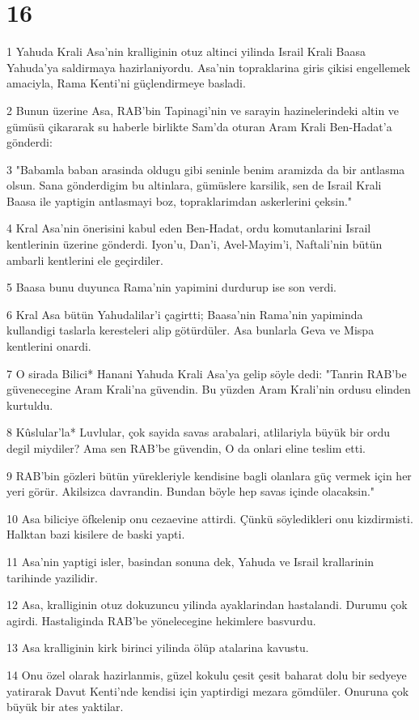 \chapter{16}

\par 1 Yahuda Krali Asa'nin kralliginin otuz altinci yilinda Israil Krali Baasa Yahuda'ya saldirmaya hazirlaniyordu. Asa'nin topraklarina giris çikisi engellemek amaciyla, Rama Kenti'ni güçlendirmeye basladi.
\par 2 Bunun üzerine Asa, RAB'bin Tapinagi'nin ve sarayin hazinelerindeki altin ve gümüsü çikararak su haberle birlikte Sam'da oturan Aram Krali Ben-Hadat'a gönderdi:
\par 3 "Babamla baban arasinda oldugu gibi seninle benim aramizda da bir antlasma olsun. Sana gönderdigim bu altinlara, gümüslere karsilik, sen de Israil Krali Baasa ile yaptigin antlasmayi boz, topraklarimdan askerlerini çeksin."
\par 4 Kral Asa'nin önerisini kabul eden Ben-Hadat, ordu komutanlarini Israil kentlerinin üzerine gönderdi. Iyon'u, Dan'i, Avel-Mayim'i, Naftali'nin bütün ambarli kentlerini ele geçirdiler.
\par 5 Baasa bunu duyunca Rama'nin yapimini durdurup ise son verdi.
\par 6 Kral Asa bütün Yahudalilar'i çagirtti; Baasa'nin Rama'nin yapiminda kullandigi taslarla keresteleri alip götürdüler. Asa bunlarla Geva ve Mispa kentlerini onardi.
\par 7 O sirada Bilici* Hanani Yahuda Krali Asa'ya gelip söyle dedi: "Tanrin RAB'be güvenecegine Aram Krali'na güvendin. Bu yüzden Aram Krali'nin ordusu elinden kurtuldu.
\par 8 Kûslular'la* Luvlular, çok sayida savas arabalari, atlilariyla büyük bir ordu degil miydiler? Ama sen RAB'be güvendin, O da onlari eline teslim etti.
\par 9 RAB'bin gözleri bütün yürekleriyle kendisine bagli olanlara güç vermek için her yeri görür. Akilsizca davrandin. Bundan böyle hep savas içinde olacaksin."
\par 10 Asa biliciye öfkelenip onu cezaevine attirdi. Çünkü söyledikleri onu kizdirmisti. Halktan bazi kisilere de baski yapti.
\par 11 Asa'nin yaptigi isler, basindan sonuna dek, Yahuda ve Israil krallarinin tarihinde yazilidir.
\par 12 Asa, kralliginin otuz dokuzuncu yilinda ayaklarindan hastalandi. Durumu çok agirdi. Hastaliginda RAB'be yönelecegine hekimlere basvurdu.
\par 13 Asa kralliginin kirk birinci yilinda ölüp atalarina kavustu.
\par 14 Onu özel olarak hazirlanmis, güzel kokulu çesit çesit baharat dolu bir sedyeye yatirarak Davut Kenti'nde kendisi için yaptirdigi mezara gömdüler. Onuruna çok büyük bir ates yaktilar.


